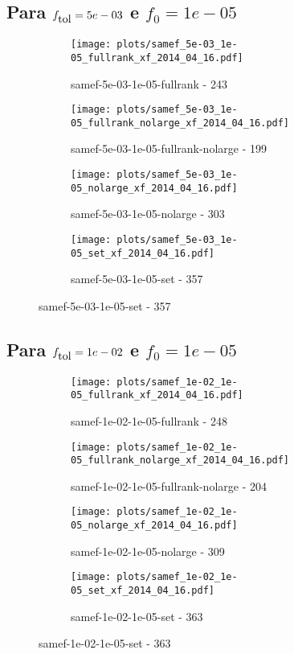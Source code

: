 \newpage
\subsection{Para $f_{\mbox{tol}} = 5e-03$ e $f_0 = 1e-05$}

\begin{figure}[H]
  \centering
  \begin{subfigure}{0.48\textwidth}
    \texttt{[image: plots/samef\_5e-03\_1e-05\_fullrank\_xf\_2014\_04\_16.pdf]}
    \caption{samef-5e-03-1e-05-fullrank - 243}
  \end{subfigure}
  \begin{subfigure}{0.48\textwidth}
    \texttt{[image: plots/samef\_5e-03\_1e-05\_fullrank\_nolarge\_xf\_2014\_04\_16.pdf]}
    \caption{samef-5e-03-1e-05-fullrank-nolarge - 199}
  \end{subfigure}
  \begin{subfigure}{0.48\textwidth}
    \texttt{[image: plots/samef\_5e-03\_1e-05\_nolarge\_xf\_2014\_04\_16.pdf]}
    \caption{samef-5e-03-1e-05-nolarge - 303}
  \end{subfigure}
  \begin{subfigure}{0.48\textwidth}
    \texttt{[image: plots/samef\_5e-03\_1e-05\_set\_xf\_2014\_04\_16.pdf]}
    \caption{samef-5e-03-1e-05-set - 357}
  \end{subfigure}
\end{figure}

\newpage
\subsection{Para $f_{\mbox{tol}} = 1e-02$ e $f_0 = 1e-05$}

\begin{figure}[H]
  \centering
  \begin{subfigure}{0.48\textwidth}
    \texttt{[image: plots/samef\_1e-02\_1e-05\_fullrank\_xf\_2014\_04\_16.pdf]}
    \caption{samef-1e-02-1e-05-fullrank - 248}
  \end{subfigure}
  \begin{subfigure}{0.48\textwidth}
    \texttt{[image: plots/samef\_1e-02\_1e-05\_fullrank\_nolarge\_xf\_2014\_04\_16.pdf]}
    \caption{samef-1e-02-1e-05-fullrank-nolarge - 204}
  \end{subfigure}
  \begin{subfigure}{0.48\textwidth}
    \texttt{[image: plots/samef\_1e-02\_1e-05\_nolarge\_xf\_2014\_04\_16.pdf]}
    \caption{samef-1e-02-1e-05-nolarge - 309}
  \end{subfigure}
  \begin{subfigure}{0.48\textwidth}
    \texttt{[image: plots/samef\_1e-02\_1e-05\_set\_xf\_2014\_04\_16.pdf]}
    \caption{samef-1e-02-1e-05-set - 363}
  \end{subfigure}
\end{figure}


